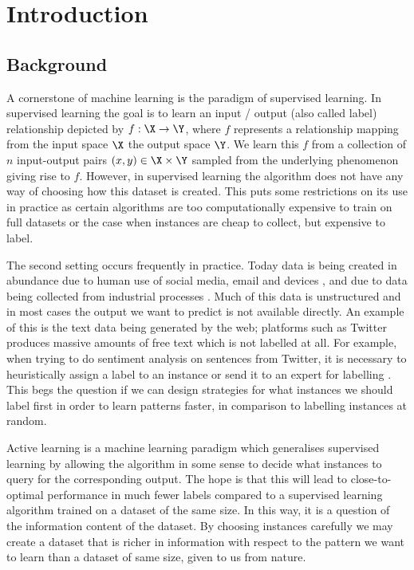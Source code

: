 \chapter{Introduction}
\label{ch:introduction}

\section{Background}
\label{sec:background}
A cornerstone of machine learning is the paradigm of supervised learning. In
supervised learning the goal is to learn an input / output (also called label)
relationship depicted by \(f : \X \to \Y\), where \(f\) represents a
relationship mapping from the input space \(\X\) the output space \(\Y\). We
learn this \(f\) from a collection of \(n\) input-output pairs \((x, y) \in \X
\times \Y\) sampled from the underlying phenomenon giving rise to \(f\).
However, in supervised learning the algorithm does not have any way of choosing how this
dataset is created. This puts some restrictions on its use in practice as certain
algorithms are too computationally expensive to train on full datasets or the
case when instances are cheap to collect, but expensive to label.

The second setting occurs frequently in practice. Today data is being created in
abundance due to human use of social media, email and devices
\cite{desjardins19_how}, and due to data being collected from industrial processes
\cite{qin14_proces_data_analy_era_big_data}. Much of this data is unstructured and
in most cases the output we want to predict is not available directly. An
example of this is the text data being generated by the web; platforms such as
Twitter produces massive amounts of free text which is not labelled at all. For
example, when trying to do sentiment analysis on sentences from Twitter, it is
necessary to heuristically assign a label to an instance or send it to an expert
for labelling \cite{pak10_twitt}. This begs the question if we can design
strategies for what instances we should label first in order to learn patterns
faster, in comparison to labelling instances at random.

Active learning \cite{cohn94_improv_gener_with_activ_learn} is a machine learning
paradigm which generalises supervised learning by allowing the algorithm in some
sense to decide what instances to query for the corresponding output. The hope
is that this will lead to close-to-optimal performance in much fewer labels
compared to a supervised learning algorithm trained on a dataset of the same
size. In this way, it is a question of the information content of the dataset.
By choosing instances carefully we may create a dataset that is richer in
information with respect to the pattern we want to learn than a dataset of same
size, given to us from nature.

